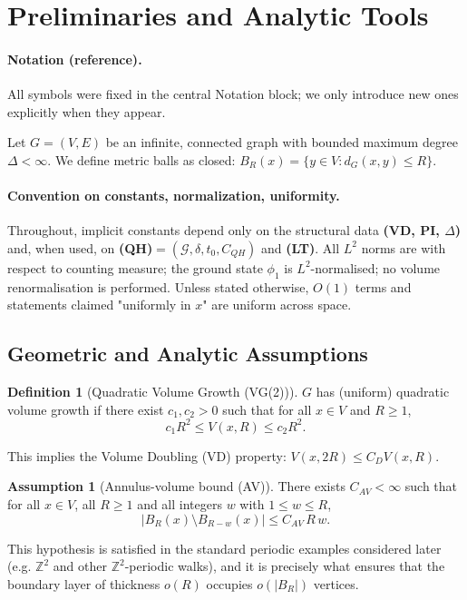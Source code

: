 \documentclass[reqno]{amsart}
\numberwithin{equation}{section}
\theoremstyle{definition}
\newtheorem{definition}[definition]{Definition}
\newtheorem{assumption}[assumption]{Assumption}
\theoremstyle{remark}
\newcommand{\cG}{\mathcal{G}}
\begin{document}
\section{Preliminaries and Analytic Tools}\label{sec:prelim}


\paragraph{Notation (reference).} All symbols were fixed in the central Notation block; we only introduce new ones explicitly when they appear.

Let $G = (V,E)$ be an infinite, connected graph with bounded maximum degree $\Delta < \infty$. We define metric balls as closed: $B_R(x) = \{y \in V : d_G(x,y) \leq R\}$.

\paragraph{Convention on constants, normalization, uniformity.}
Throughout, implicit constants depend only on the structural data \textbf{(VD, PI, $\Delta$)} and, when used, on \textbf{(QH)}$=(\cG,\delta,t_0,C_{QH})$ and \textbf{(LT)}. All $L^2$ norms are with respect to counting measure; the ground state $\phi_1$ is $L^2$-normalised; no volume renormalisation is performed. Unless stated otherwise, $O(1)$ terms and statements claimed "uniformly in $x$" are uniform across space.

\subsection{Geometric and Analytic Assumptions}

\begin{definition}[Quadratic Volume Growth (VG(2))]
$G$ has (uniform) quadratic volume growth if there exist $c_1, c_2 > 0$ such that for all $x \in V$ and $R \geq 1$,
\begin{equation}\label{eq:quad}
c_1 R^{2} \leq V(x,R) \leq c_2 R^{2}.
\end{equation}
\end{definition}
This implies the Volume Doubling (VD) property: $V(x,2R) \leq C_D V(x,R)$.

\begin{assumption}[Annulus-volume bound (AV)]\label{ass:AV}
There exists $C_{AV}<\infty$ such that for all $x\in V$, all $R\ge 1$ and all integers $w$ with $1\le w\le R$,
\[
  |B_R(x)\setminus B_{R-w}(x)|\le C_{AV}\,R\,w.
\]
\end{assumption}
\noindent This hypothesis is satisfied in the standard periodic examples considered later (e.g. $\mathbb Z^2$ and other $\mathbb Z^2$-periodic walks), and it is precisely what ensures that the boundary layer of thickness $o(R)$ occupies $o(|B_R|)$ vertices.
\end{document}
